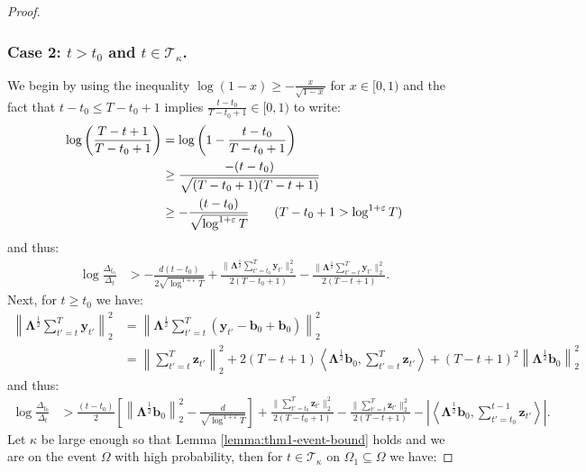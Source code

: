 \begin{proof}
\subsubsection*{Case 2: $t > t_0$ and $t\in\mathcal{T}_\kappa$.}

We begin by using the inequality $\log(1 - x) \geq -\frac{x}{\sqrt{1-x}}$ for $x \in [0,1)$ and the fact that $t - t_0 \leq T-t_0+1$ implies $\frac{t-t_0}{T-t_0+1}\in [0,1)$ to write: 
\begin{align*}
    \log \left(\frac{T-t+1}{T-t_0+1}\right) &= \log\left(1 - \frac{t-t_0}{T-t_0+1}\right) \\
    &\geq \frac{-(t-t_0)}{\sqrt{(T-t_0+1)(T-t+1)}}  \\
    &\geq -\frac{(t-t_0)}{\sqrt{\log^{1+\varepsilon} T}} \tag{$T-t_0+1 > \log^{1+\varepsilon} T$}
\end{align*}
and thus:
\begin{align*}
    \log \frac{\Delta_{t_0}}{\Delta_t} &> -\frac{d(t-t_0)}{2\sqrt{\log^{1+\varepsilon}  T}} + \frac{\lVert\boldsymbol{\Lambda}^{\frac{1}{2}} \sum_{t'=t_0}^T\mathbf{y}_{t'}\rVert_2^2}{2(T-t_0+1)}- \frac{\lVert\boldsymbol{\Lambda}^{\frac{1}{2}} \sum_{t'=t}^T\mathbf{y}_{t'}\rVert_2^2}{2(T-t+1)}.
\end{align*}
Next, for $t \geq t_0$ we have:
\begin{align*}
    \left\lVert\boldsymbol{\Lambda}^{\frac{1}{2}} \sum_{t'=t}^T\mathbf{y}_{t'}\right\rVert_2^2 &= \left\lVert\boldsymbol{\Lambda}^{\frac{1}{2}} \sum_{t'=t}^T(\mathbf{y}_{t'} - \mathbf{b}_0 + \mathbf{b}_0)\right\rVert_2^2 \\
    &= \left\lVert \sum_{t'=t}^T \mathbf{z}_{t'}\right\rVert_2^2 + 2(T-t+1) \left\langle\boldsymbol{\Lambda}^{\frac{1}{2}}\mathbf{b}_0, \sum_{t'=t}^T\mathbf{z}_{t'} \right\rangle + (T-t+1)^2\left\lVert\boldsymbol{\Lambda}^{\frac{1}{2}}\mathbf{b}_0\right\rVert_2^2 
\end{align*}
and thus:
\begin{align*}
    \log \frac{\Delta_{t_0}}{\Delta_t} &> \frac{(t-t_0)}{2}\left[\left\lVert\boldsymbol{\Lambda}^{\frac{1}{2}}\mathbf{b}_0\right\rVert_2^2 - \frac{d}{\sqrt{\log^{1+\varepsilon}  T}}\right] + \frac{\lVert\sum_{t'=t_0}^T\mathbf{z}_{t'}\rVert_2^2}{2(T-t_0+1)} - \frac{\lVert\sum_{t'=t}^T\mathbf{z}_{t'}\rVert_2^2}{2(T-t+1)} - \left| \left\langle\boldsymbol{\Lambda}^{\frac{1}{2}}\mathbf{b}_0, \sum_{t'=t_0}^{t-1}\mathbf{z}_{t'} \right\rangle\right|. 
\end{align*}
Let $\kappa$ be large enough so that Lemma \ref{lemma:thm1-event-bound} holds and we are on the event $\Omega$ with high probability, then for $t \in \mathcal{T}_\kappa$ on $\Omega_1\subseteq\Omega$ we have:

\end{proof}
